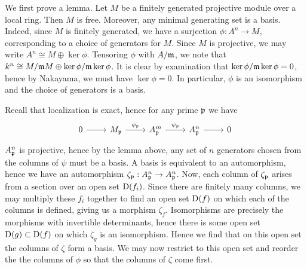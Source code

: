 \documentclass{article}
\begin{document}
We first prove a lemma. Let $M$ be a finitely generated
projective module over a local ring. Then $M$ is free.
Moreover, any minimal generating set is a basis. Indeed, since
$M$ is finitely generated, we have a surjection
$\phi: A^n \to M$, corresponding to a choice of generators for
$M$. Since $M$ is projective, we may
write $A^n \cong M \oplus \ker \phi$. Tensoring $\phi$ with
$A/\mathfrak{m}$, we note that $k^n \cong M/\mathfrak{m} M \oplus \ker \phi/\mathfrak{m}\ker \phi$. It is clear by
examination that $\ker \phi/\mathfrak{m}\ker \phi = 0$, hence by Nakayama, we must have
$\ker \phi = 0$. In particular, $\phi$ is an
isomorphism and the choice of generators is a basis.

Recall that localization is exact, hence for any prime $\mathfrak{p}$
we have \[\begin{tikzcd}
        0 & {M_\mathfrak{p}} & {A^m_\mathfrak{p}} & {A^n_\mathfrak{p}} & 0
        \arrow[from=1-4, to=1-5]
        \arrow["\psi_\p", from=1-3, to=1-4]
        \arrow["\phi_\p", from=1-2, to=1-3]
        \arrow[from=1-1, to=1-2]
    \end{tikzcd}\] $A_{\mathfrak{p}}^n$ is projective, hence by
the lemma above, any set of $n$ generators chosen from the
columns of $\psi$ must be a basis. A basis is equivalent to an
automorphism, hence we have an automorphism $\zeta_{\mathfrak{p}}: A_{\mathfrak{p}}^n \to A_{\mathfrak{p}}^n$. Now, each
column of $\zeta_{\mathfrak{p}}$ arises from a section over an open set
$\operatorname{D}(f_i)$. Since there are finitely many columns, we may multiply
these $f_i$ together to find an open set
$\operatorname{D}(f)$ on which each of the columns is defined, giving us a
morphism $\zeta_f$. Isomorphisms are precisely the morphisms with
invertible determinants, hence there is some open set $\operatorname{D}(g) \subset \operatorname{D}(f)$
on which $\zeta_{g}$ is an isomorphism. Hence we find that on this
open set the columns of $\zeta$ form a basis. We may now
restrict to this open set and reorder the the columns of
$\phi$ so that the columns of $\zeta$ come
first.
\end{document}
